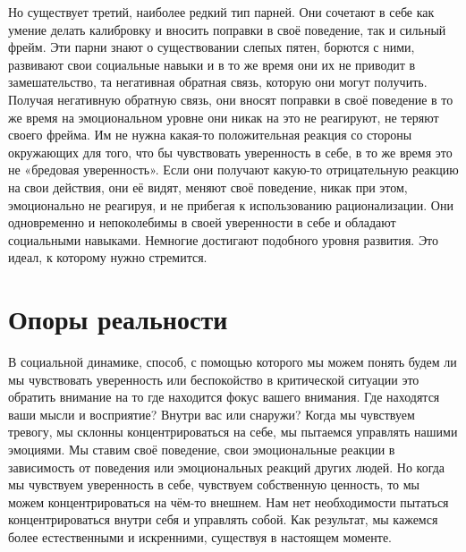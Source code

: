 Но существует третий, наиболее редкий тип парней. Они сочетают в себе как умение делать калибровку и вносить поправки в своё поведение, так и сильный фрейм. Эти парни знают о существовании слепых пятен, борются с ними, развивают свои социальные навыки и в то же время они их не приводит в замешательство, та негативная обратная связь, которую они могут получить. Получая негативную обратную связь, они вносят поправки в своё поведение в то же время на эмоциональном уровне они никак на это не реагируют, не теряют своего фрейма. Им не нужна какая-то положительная реакция со стороны окружающих для того, что бы чувствовать уверенность в себе, в то же время это не «бредовая уверенность». Если они получают какую-то отрицательную реакцию на свои действия, они её видят, меняют своё поведение, никак при этом, эмоционально не реагируя, и не прибегая к использованию рационализации. Они одновременно и непоколебимы в своей уверенности в себе и обладают социальными навыками. Немногие достигают подобного уровня развития. Это идеал, к которому нужно стремится.

\chapter{Опоры реальности}

В социальной динамике, способ, с помощью которого мы можем понять будем ли мы чувствовать уверенность или беспокойство в критической ситуации это обратить внимание на то где находится фокус вашего внимания. Где находятся ваши мысли и восприятие? Внутри вас или снаружи? Когда мы чувствуем тревогу, мы склонны концентрироваться на себе, мы пытаемся управлять нашими эмоциями. Мы ставим своё поведение, свои эмоциональные реакции в зависимость от поведения или эмоциональных реакций других людей. Но когда мы чувствуем уверенность в себе, чувствуем собственную ценность, то мы можем концентрироваться на чём-то внешнем. Нам нет необходимости пытаться концентрироваться внутри себя и управлять собой. Как результат, мы кажемся более естественными и искренними, существуя в настоящем моменте.

